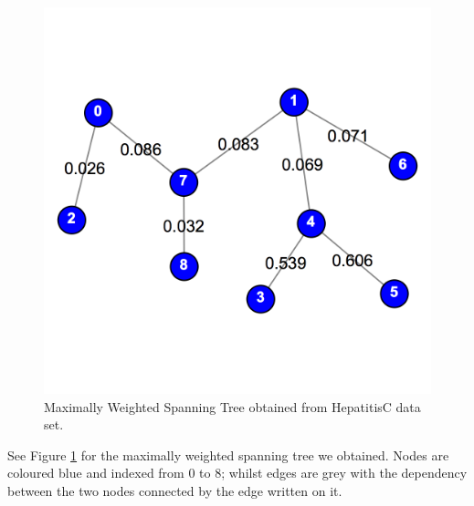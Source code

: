 \documentclass[12pt]{article}
\begin{document}
\begin{figure}
	\centering
	\includegraphics[width=0.8\linewidth]{spanningTree.png}
	\caption[Maximally Weighted Spanning Tree obtained from HepatitisC data set]{\label{fig:maximallyWeightedSpanningTree} Maximally Weighted Spanning Tree obtained from HepatitisC data set.}
\end{figure}

See Figure \ref{fig:maximallyWeightedSpanningTree} for the maximally weighted spanning tree we obtained. Nodes are coloured blue and indexed from 0 to 8; whilst edges are grey with the dependency between the two nodes connected by the edge written on it.
\end{document}
